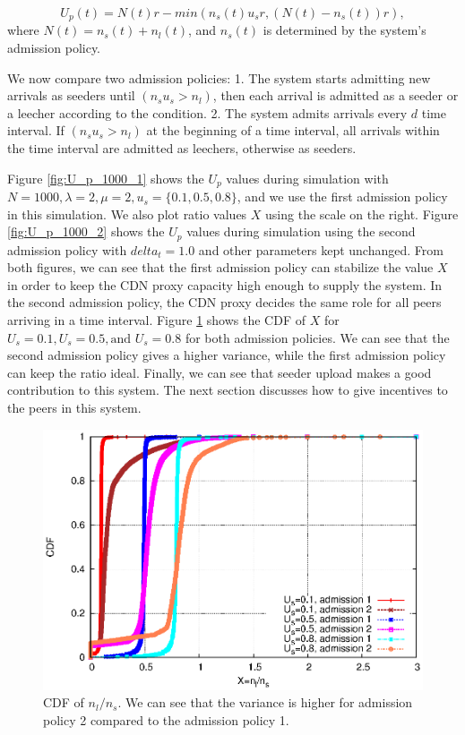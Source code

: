 \documentclass[paper]{ieice}
\begin{document}
\begin{equation}
        U_p(t) = N(t)r - min(n_s(t) u_s r, (N(t) - n_s(t))r),
\end{equation}
where $N(t) = n_s(t) + n_l(t)$, and $n_s(t)$ is determined by the system's admission policy.

We now compare two admission policies:
1. The system starts admitting new arrivals as seeders until $(n_su_s > n_l)$, then each arrival is admitted as a seeder or a leecher according to the condition.     
2. The system admits arrivals every $d$ time interval. If $(n_su_s > n_l)$ at the beginning of a time interval, all arrivals within the time interval are admitted as leechers, otherwise as seeders.

Figure \ref{fig:U_p_1000_1} shows the $U_p$ values during simulation with $N=1000, \lambda=2, \mu=2, u_s=\{0.1, 0.5, 0.8\}$, and we use the first admission policy in this simulation.  
We also plot ratio values $X$ using the scale on the right.  Figure \ref{fig:U_p_1000_2} shows the $U_p$ values during simulation using the second admission policy with $delta_t=1.0$ and other parameters kept unchanged.  
From both figures, we can see that the first admission policy can stabilize the value $X$ in order to keep the CDN proxy capacity high enough to supply the system.  
In the second admission policy, the CDN proxy decides the same role for all peers arriving in a time interval.
Figure \ref{fig:cdf} shows the CDF of $X$ for $U_s=0.1, U_s=0.5, \text{and } U_s=0.8$ for both admission policies.  
We can see that the second admission policy gives a higher variance, while the first admission policy can keep the ratio ideal.  
Finally, we can see that seeder upload makes a good contribution to this system.  
The next section discusses how to give incentives to the peers in this system.

\begin{figure}[hb] 
\begin{center}
\includegraphics[scale=0.65]{graphs/cdf.eps}
\end{center}
\caption{CDF of $n_l/n_s$. We can see that the variance is higher for admission policy 2 compared to the admission policy 1.}
\label{fig:cdf}
\vspace{-2mm}
\end{figure}
 
\end{document}
